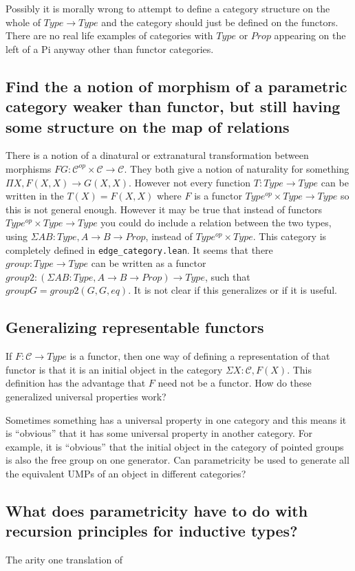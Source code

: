 \documentclass[12pt]{article} %
\theoremstyle{definition}
\theoremstyle{definition}
\theoremstyle{definition}
\theoremstyle{definition}
\begin{document}
Possibly it is morally wrong to attempt to define a category structure on the whole of
$Type \rightarrow Type$ and the category should just be defined on the functors. 
There are no real life examples of categories with $Type$ or $Prop$ appearing on the left of a 
Pi anyway other than functor categories.

\subsection{Find the a notion of morphism of a parametric category weaker than functor, but
  still having some structure on the map of relations}

There is a notion of a dinatural or extranatural transformation between morphisms 
$F G : \mathcal{C}^{op} \times \mathcal{C} \rightarrow \mathcal{C}$. They both give 
a notion of naturality for something $\Pi X, F(X, X) \rightarrow G(X,X)$. However not
every function $T : Type \rightarrow Type$ can be written in the $T(X) = F(X, X)$ where 
$F$ is a functor $Type^{op} \times Type \rightarrow Type$ so this is not general enough. 
However it may be true that instead of functors $Type^{op} \times Type \rightarrow Type$
you could do include a relation between the two types, using $\Sigma A B : Type, A \rightarrow B \rightarrow Prop$,
instead of $Type^{op} \times Type$. This category is completely defined in \lstinline{edge_category.lean}.
It seems that there $group : Type \rightarrow Type$ can be written as a functor
$group2 : (\Sigma A B : Type, A \rightarrow B \rightarrow Prop) \rightarrow Type$, such that 
$group G = group2(G, G, eq)$. It is not clear if this generalizes or if it is useful.

\subsection{Generalizing representable functors}
If $F : \mathcal{C} \rightarrow Type$ is a functor, then one way of defining a representation
of that functor is that it is an initial object in the category $\Sigma X : \mathcal{C}, F(X)$.
This definition has the advantage that $F$ need not be a functor. How do these generalized 
universal properties work?

Sometimes something has a universal property in one category and this means it is ``obvious'' that 
it has some universal property in another category. For example, it is ``obvious'' that the initial
object in the category of pointed groups is also the free group on one generator. Can parametricity be used 
to generate all the equivalent UMPs of an object in different categories?

\subsection{What does parametricity have to do with recursion principles for inductive types?}

The arity one translation of 


\end{document}
